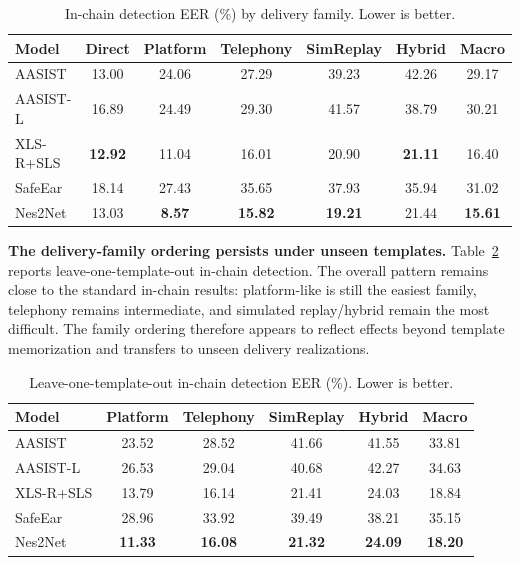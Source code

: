 \begin{table}[t]
\centering
\footnotesize
\setlength{\tabcolsep}{4pt}
\renewcommand{\arraystretch}{1.02}
\caption{In-chain detection EER (\%) by delivery family. Lower is better.}
\label{tab:exp_inchain}
\vspace{-0.5em}
\begin{tabular}{@{}lcccccc@{}}
\toprule
\textbf{Model} & \textbf{Direct} & \textbf{Platform} & \textbf{Telephony} & \textbf{SimReplay} & \textbf{Hybrid} & \textbf{Macro} \\
\midrule
AASIST       & 13.00 & 24.06 & 27.29 & 39.23 & 42.26 & 29.17 \\
AASIST-L     & 16.89 & 24.49 & 29.30 & 41.57 & 38.79 & 30.21 \\
XLS-R+SLS    & \textbf{12.92} & 11.04 & 16.01 & 20.90 & \textbf{21.11} & 16.40 \\
SafeEar      & 18.14 & 27.43 & 35.65 & 37.93 & 35.94 & 31.02 \\
Nes2Net      & 13.03 & \textbf{8.57} & \textbf{15.82} & \textbf{19.21} & 21.44 & \textbf{15.61} \\
\bottomrule
\end{tabular}
\end{table}

\noindent\textbf{The delivery-family ordering persists under unseen templates.}
Table~\ref{tab:exp_holdout} reports leave-one-template-out in-chain detection. The overall pattern remains close to the standard in-chain results: platform-like is still the easiest family, telephony remains intermediate, and simulated replay/hybrid remain the most difficult. The family ordering therefore appears to reflect effects beyond template memorization and transfers to unseen delivery realizations.

\begin{table}[t]
\centering
\footnotesize
\setlength{\tabcolsep}{4pt}
\renewcommand{\arraystretch}{1.02}
\caption{Leave-one-template-out in-chain detection EER (\%). Lower is better.}
\label{tab:exp_holdout}
\vspace{-0.5em}
\begin{tabular*}{0.96\linewidth}{@{\extracolsep{\fill}}lccccc@{}}
\toprule
\textbf{Model} & \textbf{Platform} & \textbf{Telephony} & \textbf{SimReplay} & \textbf{Hybrid} & \textbf{Macro} \\
\midrule
AASIST       & 23.52 & 28.52 & 41.66 & 41.55 & 33.81 \\
AASIST-L     & 26.53 & 29.04 & 40.68 & 42.27 & 34.63 \\
XLS-R+SLS    & 13.79 & 16.14 & 21.41 & 24.03 & 18.84 \\
SafeEar      & 28.96 & 33.92 & 39.49 & 38.21 & 35.15 \\
Nes2Net      & \textbf{11.33} & \textbf{16.08} & \textbf{21.32} & \textbf{24.09} & \textbf{18.20} \\
\bottomrule
\end{tabular*}
\end{table}

